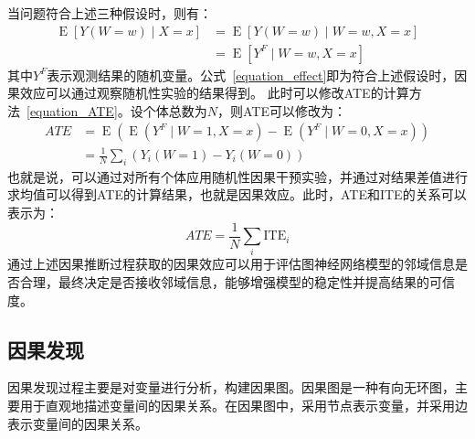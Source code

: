 \documentclass[algorithmlist, AutoFakeBold, AutoFakeSlant, figurelist, tablelist, nomlist, masters]{seuthesix}
\begin{document}
当问题符合上述三种假设时，则有：
\begin{equation}
  \begin{aligned}
  \operatorname{E}[Y(W=w) \mid X=x] & =\operatorname{E}[Y(W=w) \mid W=w, X=x] \\
  & =\operatorname{E}\left[Y^F \mid W=w, X=x\right]
  \end{aligned}
  \label{equation_effect}
\end{equation}
其中$Y^F$表示观测结果的随机变量。公式~\ref{equation_effect}即为符合上述假设时，因果效应可以通过观察随机性实验的结果得到。
此时可以修改ATE的计算方法~\ref{equation_ATE}。设个体总数为$N$，则ATE可以修改为：
\begin{equation}
  \begin{aligned}
  ATE & =\operatorname{E}\left(\operatorname{E}\left(Y^F \mid W=1, X=x\right)-\operatorname{E}\left(Y^F \mid W=0, X=x\right)\right) \\
  & =\frac{1}{N} \sum_i\left(Y_i(W=1)-Y_i(W=0)\right)
  \end{aligned}
  \label{equation_newATE}
\end{equation}
也就是说，可以通过对所有个体应用随机性因果干预实验，并通过对结果差值进行求均值可以得到ATE的计算结果，也就是因果效应。此时，ATE和ITE的关系可以表示为：
\begin{equation}
  ATE = \frac{1}{N} \sum_i \mathrm{ITE}_i
  \label{equation_ATEandITE}
\end{equation}
通过上述因果推断过程获取的因果效应可以用于评估图神经网络模型的邻域信息是否合理，最终决定是否接收邻域信息，能够增强模型的稳定性并提高结果的可信度。

\subsection{因果发现}
因果发现过程主要是对变量进行分析，构建因果图。因果图是一种有向无环图，主要用于直观地描述变量间的因果关系。在因果图中，采用节点表示变量，并采用边表示变量间的因果关系。
\end{document}
